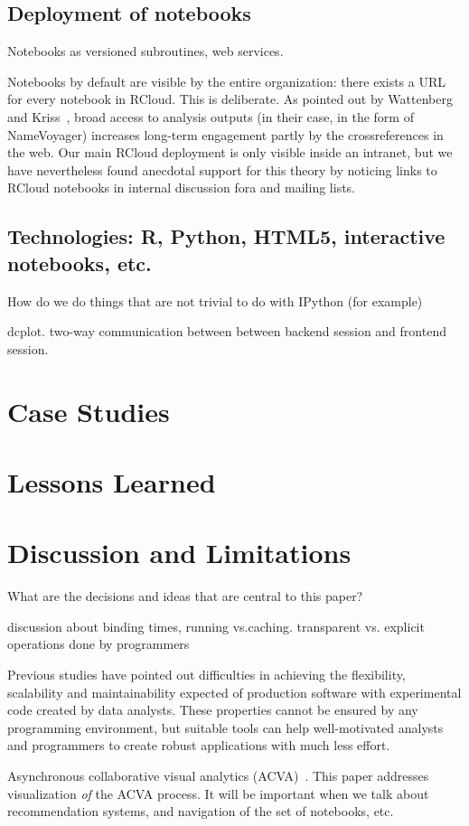 \documentclass[review,journal]{vgtc}         %
\begin{document}
\subsection{Deployment of notebooks\label{sec:deployment}}

Notebooks as versioned subroutines, web services.

Notebooks by default are visible by the entire organization: there
exists a URL for every notebook in RCloud. This is deliberate. As
pointed out by Wattenberg and Kriss~\cite{Wattenberg:2011:DFS}, broad
access to analysis outputs (in their case, in the form of NameVoyager)
increases long-term engagement partly by the crossreferences in the
web. Our main RCloud deployment is only visible inside an intranet,
but we have nevertheless found anecdotal support for this theory by
noticing links to RCloud notebooks in internal discussion fora and
mailing lists.

\subsection{Technologies: R, Python, HTML5, interactive notebooks, etc.}

How do we do things that are not trivial to do with IPython (for example)

dcplot. two-way communication between between backend session and
frontend session.

\section{Case Studies}

\section{Lessons Learned}

\section{Discussion and Limitations}

What are the decisions and ideas that are central to this paper?

discussion about binding times, running vs.caching.
transparent vs. explicit operations done by programmers

Previous studies have pointed out difficulties in achieving the flexibility,
scalability and maintainability expected of production software with experimental
code created by data analysts.
These properties cannot be ensured by any programming environment,
but suitable tools can help well-motivated analysts and programmers to create
robust applications with much less effort.

Asynchronous collaborative visual analytics
(ACVA)~\cite{Chen:2011:SEC}. This paper addresses visualization
\emph{of} the ACVA process. It will be important when we talk about
recommendation systems, and navigation of the set of notebooks, etc.




\end{document}

